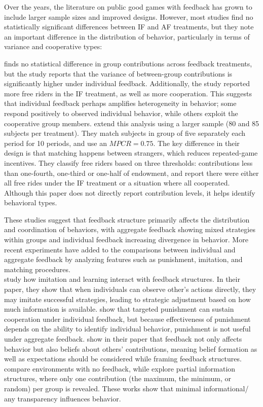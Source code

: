 \documentclass[12pt,letterpaper,english]{article}
\begin{document}
Over the years, the literature on public good games with feedback has grown to include larger sample sizes and improved designs. However, most studies find no statistically significant differences between IF and AF treatments, but they note an important difference in the distribution of behavior, particularly in terms of variance and cooperative types:

\cite{croson2001feedback} finds no statistical difference in group contributions across feedback treatments, but the study reports that the variance of between-group contributions is significantly higher under individual feedback. Additionally, the study reported more free riders in the IF treatment, as well as more cooperation. This suggests that individual feedback perhaps amplifies heterogeneity in behavior; some respond positively to observed individual behavior, while others exploit the cooperative group members.\cite{carpenter2004rome} extend this analysis using a larger sample (80 and 85 subjects per treatment). They match subjects in group of five separately each period for 10 periods, and use an $MPCR = 0.75$. The key difference in their design is that matching happens between strangers, which reduces repeated-game incentives. They classify free riders based on three thresholds: contributions less than one-fourth, one-third or one-half of endowment, and report there were either all free rides under the IF treatment or a situation where all cooperated. Although this paper does not directly report contribution levels, it helps identify behavioral types. 

These studies suggest that feedback structure primarily affects the distribution and coordination of behaviors, with aggregate feedback showing mixed strategies within groups and individual feedback increasing divergence in behavior. More recent experiments have added to the comparisons between individual and aggregate feedback by analyzing features such as punishment, imitation, and matching procedures.\\
\cite{bigoni2012feedback} study how imitation and learning interact with feedback structures. In their paper, they show that when individuals can observe other's actions directly, they may imitate successful strategies, leading to strategic adjustment based on how much information is available.
\cite{nikiforakis2010feedback} show that targeted punishment can sustain cooperation under individual feedback, but because effectiveness of punishment depends on the ability to identify individual behavior, punishment is not useful under aggregate feedback.\cite{cox2015framing} show in their paper that feedback not only affects behavior but also beliefs about others' contributions, meaning belief formation as well as expectations should be considered while framing feedback structures. \cite{cason1999laboratory} compare environments with no feedback, while \cite{irlenbusch2019designing} explore partial information structures, where only one contribution (the maximum, the minimum, or random) per group is revealed. These works show that minimal informational/ any transparency influences behavior.
\end{document}
